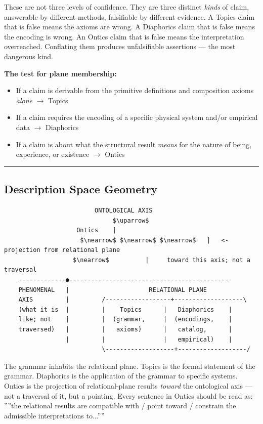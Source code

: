 \documentclass[11pt,a4paper]{article}
\begin{document}
These are not three levels of confidence. They are three distinct \emph{kinds} of claim, answerable by different methods, falsifiable by different evidence. A Topics claim that is false means the axioms are wrong. A Diaphorics claim that is false means the encoding is wrong. An Ontics claim that is false means the interpretation overreached. Conflating them produces unfalsifiable assertions --- the most dangerous kind.

\textbf{The test for plane membership:}

\begin{itemize}
    \item If a claim is derivable from the primitive definitions and composition axioms \emph{alone} $\to$ Topics
    \item If a claim requires the encoding of a specific physical system and/or empirical data $\to$ Diaphorics
    \item If a claim is about what the structural result \emph{means} for the nature of being, experience, or existence $\to$ Ontics
\end{itemize}

\begin{center}
\rule{0.5\textwidth}{0.4pt}
\end{center}

\subsection{Description Space Geometry}

\begin{lstlisting}
                         ONTOLOGICAL AXIS
                              $\uparrow$
                    Ontics    |
                     $\nearrow$ $\nearrow$ $\nearrow$   |   <- projection from relational plane
                   $\nearrow$          |     toward this axis; not a traversal
    -------------●--------------------------------------------
    PHENOMENAL   |                      RELATIONAL PLANE
    AXIS         |         /------------------+-------------------\
    (what it is  |         |    Topics      |   Diaphorics    |
    like; not    |         |  (grammar,     |  (encodings,    |
    traversed)   |         |   axioms)      |   catalog,      |
                 |         |                |   empirical)    |
                           \-------------------+-------------------/
\end{lstlisting}

The grammar inhabits the relational plane. Topics is the formal statement of the grammar. Diaphorics is the application of the grammar to specific systems. Ontics is the projection of relational-plane results \emph{toward} the ontological axis --- not a traversal of it, but a pointing. Every sentence in Ontics should be read as: ''''the relational results are compatible with / point toward / constrain the admissible interpretations to...''''
\end{document}
